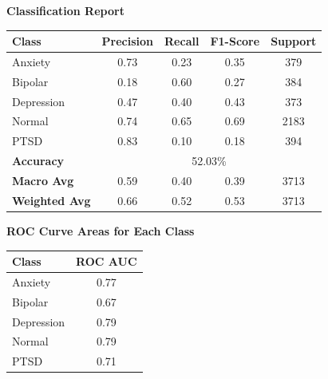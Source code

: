 \begin{center}
    \textbf{Classification Report} \\[0.5em]
    \begin{tabular}{|l|c|c|c|c|}
        \hline
        \textbf{Class} & \textbf{Precision} & \textbf{Recall} & \textbf{F1-Score} & \textbf{Support} \\ \hline
        Anxiety        & 0.73               & 0.23            & 0.35              & 379             \\ \hline
        Bipolar        & 0.18               & 0.60            & 0.27              & 384             \\ \hline
        Depression     & 0.47               & 0.40            & 0.43              & 373             \\ \hline
        Normal         & 0.74               & 0.65            & 0.69              & 2183            \\ \hline
        PTSD           & 0.83               & 0.10            & 0.18              & 394             \\ \hline
        \textbf{Accuracy} & \multicolumn{4}{|c|}{52.03\%} \\ \hline
        \textbf{Macro Avg} & 0.59            & 0.40            & 0.39              & 3713            \\ \hline
        \textbf{Weighted Avg} & 0.66         & 0.52            & 0.53              & 3713            \\ \hline
    \end{tabular}
\end{center}

\begin{center}
    \textbf{ROC Curve Areas for Each Class} \\[0.5em]
    \begin{tabular}{|l|c|}
        \hline
        \textbf{Class}  & \textbf{ROC AUC} \\ \hline
        Anxiety         & 0.77            \\ \hline
        Bipolar         & 0.67            \\ \hline
        Depression      & 0.79            \\ \hline
        Normal          & 0.79            \\ \hline
        PTSD            & 0.71            \\ \hline
    \end{tabular}
\end{center}

